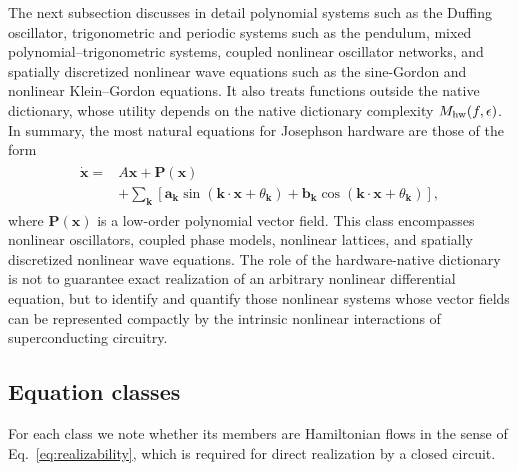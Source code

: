 \documentclass[pra,twocolumn,superscriptaddress,nofootinbib,floatfix]{revtex4-2}
\theoremstyle{remark}
\newcommand{\revcolor}{\color{blue}}
\DeclareRobustCommand{\rev}[1]{{\revcolor #1}}
\begin{document}
\rev{The next subsection discusses in detail polynomial systems such as the Duffing oscillator, trigonometric and periodic systems such as the pendulum, mixed polynomial--trigonometric systems, coupled nonlinear oscillator networks, and spatially discretized nonlinear wave equations such as the sine-Gordon and nonlinear Klein--Gordon equations.} \rev{It also treats functions outside the native dictionary, whose utility depends on the native dictionary complexity \(M_{\rm hw}(f,\epsilon)\).} \rev{In summary, the most natural equations for Josephson hardware are those of the form}
\begin{align}
\boxed{
\begin{aligned}
\dot{\mathbf x}={}&A\mathbf x+\mathbf P(\mathbf x)\\
&+\sum_{\mathbf k}\left[\mathbf a_{\mathbf k}\sin(\mathbf k\cdot\mathbf x+\theta_{\mathbf k})+\mathbf b_{\mathbf k}\cos(\mathbf k\cdot\mathbf x+\theta_{\mathbf k})\right],
\end{aligned}
}
\label{eq:native-target-class}
\end{align}
where \(\mathbf P(\mathbf x)\) is a low-order polynomial vector field. This class encompasses nonlinear oscillators, coupled phase models, nonlinear lattices, and spatially discretized nonlinear wave equations. The role of the hardware-native dictionary is not to guarantee exact realization of an arbitrary nonlinear differential equation, but to identify and quantify those nonlinear systems whose vector fields can be represented compactly by the intrinsic nonlinear interactions of superconducting circuitry.

\subsection{\rev{Equation classes}}

\rev{For each class we note whether its members are Hamiltonian flows in the sense of Eq.~\eqref{eq:realizability}, which is required for direct realization by a closed circuit.}
\end{document}
